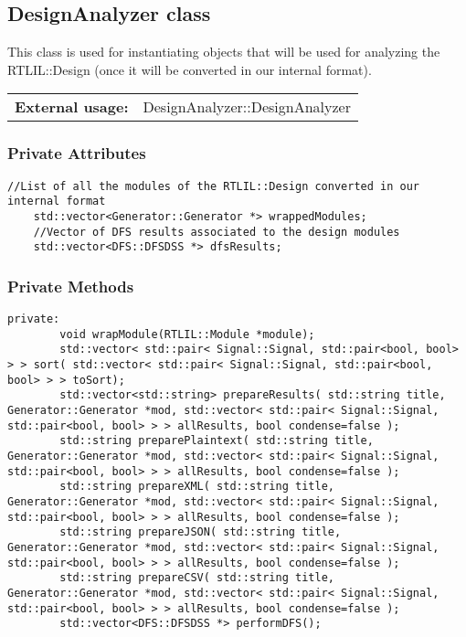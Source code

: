 \documentclass{article}
\begin{document}
\subsection{DesignAnalyzer class}

This class is used for instantiating objects that will be used for analyzing the RTLIL::Design (once it will be converted in our internal format).\\

\begin{tabular}{ll}
	\textbf{External usage: } & DesignAnalyzer::DesignAnalyzer\\
\end{tabular}

\subsubsection{Private Attributes}

\begin{mdframed}[hidealllines=true, backgroundcolor=magenta!10]
	\begin{lstlisting}[basicstyle=\tiny]
	//List of all the modules of the RTLIL::Design converted in our internal format
	std::vector<Generator::Generator *> wrappedModules;
	//Vector of DFS results associated to the design modules
	std::vector<DFS::DFSDSS *> dfsResults;
	\end{lstlisting}
\end{mdframed}

\subsubsection{Private Methods}

\begin{mdframed}[hidealllines=true, backgroundcolor=magenta!10]
	\begin{lstlisting}[basicstyle=\tiny]
	private:
		void wrapModule(RTLIL::Module *module);
		std::vector< std::pair< Signal::Signal, std::pair<bool, bool> > > sort( std::vector< std::pair< Signal::Signal, std::pair<bool, bool> > > toSort);
		std::vector<std::string> prepareResults( std::string title, Generator::Generator *mod, std::vector< std::pair< Signal::Signal, std::pair<bool, bool> > > allResults, bool condense=false );
		std::string preparePlaintext( std::string title, Generator::Generator *mod, std::vector< std::pair< Signal::Signal, std::pair<bool, bool> > > allResults, bool condense=false );
		std::string prepareXML( std::string title, Generator::Generator *mod, std::vector< std::pair< Signal::Signal, std::pair<bool, bool> > > allResults, bool condense=false );
		std::string prepareJSON( std::string title, Generator::Generator *mod, std::vector< std::pair< Signal::Signal, std::pair<bool, bool> > > allResults, bool condense=false );
		std::string prepareCSV( std::string title, Generator::Generator *mod, std::vector< std::pair< Signal::Signal, std::pair<bool, bool> > > allResults, bool condense=false );
		std::vector<DFS::DFSDSS *> performDFS();
	\end{lstlisting}
\end{mdframed}
\end{document}
